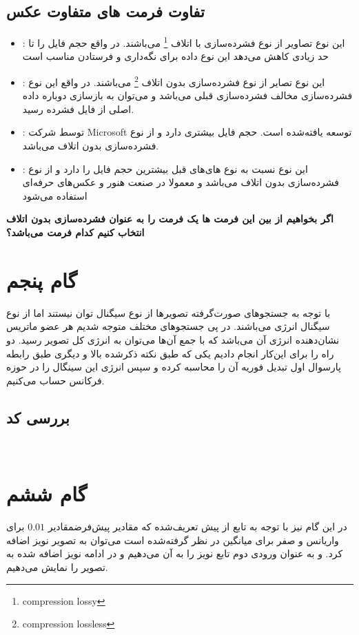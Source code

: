 \subsection{تفاوت فرمت های متفاوت عکس}
\begin{itemize}
    \item {}
    :
    این نوع تصاویر از نوع 
    فشرده‌سازی با اتلاف
    \footnote{compression lossy }
    می‌باشند.
    در 
    واقع حجم فایل را تا حد زیادی کاهش می‌دهد
    این نوع داده برای نگه‌داری و فرستادن مناسب است
    \item {}
    :
    این نوع تصایر از نوع فشرده‌سازی 
    بدون اتلاف
    \footnote{ compression lossless}
    می‌باشند.
    در واقع این نوع فشرده‌سازی مخالف فشرده‌سازی قبلی می‌باشد و می‌توان به بازسازی دوباره داده اصلی از فایل فشرده رسید.
    \item {}
    :
    توسط شرکت 
    Microsoft   
    توسعه یافته‌شده است.
    حجم فایل بیشتری دارد
    و از نوع 
    فشرده‌سازی بدون اتلاف می‌باشد.
    \item {}
    :
    این نوع نسبت به نوع های‌های قبل بیشترین حجم فایل را دارد و از نوع 
    فشرده‌سازی بدون اتلاف می‌باشد و معمولا در صنعت هنور و عکس‌های حرفه‌ای استفاده می‌شود
\end{itemize}

\textbf{اگر بخواهیم از بین این فرمت ها یک فرمت را به عنوان فشرده‌سازی بدون اتلاف انتخاب کنیم کدام فرمت می‌باشد؟}
\section{گام پنجم}
با توجه به جستجوهای صورت‌گرفته تصویرها از نوع سیگنال توان نیستند اما از نوع سیگنال انرژی می‌باشند.
در پی جستجوهای مختلف 
متوجه شدیم هر عضو ماتریس نشان‌دهنده انرژی آن می‌باشد که با جمع آن‌ها می‌توان به انرژی کل تصویر رسید.
دو راه را برای این‌کار انجام دادیم یکی که طبق نکته ذکرشده بالا و دیگری 
طبق رابطه پارسوال اول تبدیل فوریه آن را محاسبه کرده و سپس انرژی این سینگال را در حوزه فرکانس حساب می‌کنیم.

\subsection{بررسی کد}
\lr{}
\\
\section{گام ششم}
در این گام نیز با توجه به تابع از پیش تعریف‌شده
که مقادیر پیش‌فرضمقادیر 
 \(0.01\)
برای واریانس و صفر برای میانگین در نظر گرفته‌شده است می‌توان به تصویر نویز اضافه کرد.
و به عنوان ورودی دوم تابع نویز
را به آن می‌دهیم
و در ادامه نویز اضافه شده به تصویر را نمایش می‌دهیم.
